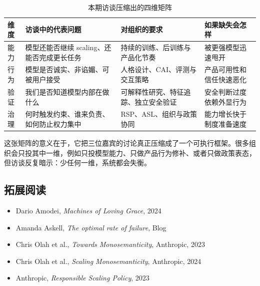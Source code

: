 \documentclass[a4paper]{article}
\begin{document}
\begin{table}[H]
\centering
\begin{tabular}{p{} p{} p{} p{}}
\toprule
维度 & 访谈中的代表问题 & 对组织的要求 & 如果缺失会怎样 \\
\midrule
能力 & 模型还能否继续 scaling、还能否完成更长任务 & 持续的训练、后训练与产品化节奏 & 被更强模型迅速甩开 \\
行为 & 模型是否诚实、非谄媚、可被用户接受 & 人格设计、CAI、评测与交互策略 & 产品可用性和信任快速恶化 \\
验证 & 我们是否知道模型内部在做什么 & 可解释性研究、特征追踪、独立安全验证 & 安全判断过度依赖外显行为 \\
治理 & 何时触发约束、谁来负责、如何防止权力集中 & RSP、ASL、组织与政策协同 & 能力增长快于制度准备速度 \\
\bottomrule
\end{tabular}
\caption{本期访谈压缩出的四维矩阵}
\end{table}

这张矩阵的意义在于，它把三位嘉宾的讨论真正压缩成了一个可执行框架。很多组织会只投其中一维，例如只投模型能力、只做产品行为修补、或者只做政策表态，但访谈反复暗示：少任何一维，系统都会失衡。

\subsection{拓展阅读}

\begin{itemize}
    \item Dario Amodei, \textit{Machines of Loving Grace}, 2024
    \item Amanda Askell, \textit{The optimal rate of failure}, Blog
    \item Chris Olah et al., \textit{Towards Monosemanticity}, Anthropic, 2023
    \item Chris Olah et al., \textit{Scaling Monosemanticity}, Anthropic, 2024
    \item Anthropic, \textit{Responsible Scaling Policy}, 2023
\end{itemize}
\end{document}

